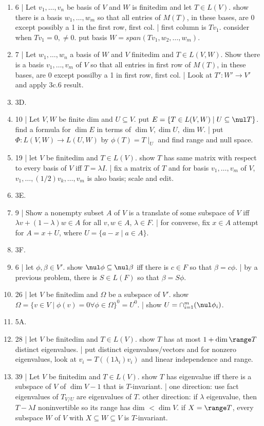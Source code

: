 \begin{enumerate}
	\item 6 | Let $v_1,\dots,v_n$ be basis of $V$ and $W$ is finitedim and let $T \in L(V)$. show there is a basis $w_1,\dots,w_m$ so that all entries of $M(T)$, in these bases, are 0 except possibly a 1 in the first row, first col. | first column is $Tv_1$. consider when $Tv_1 = 0, \neq 0$. put basis $W = span(Tv_1,w_2,\dots,w_m)$. 
	\item 7 | Let $w_1,\dots,w_n$ a basis of $W$ and $V$ finitedim and $T \in L(V,W)$. Show there is a basis $v_1,\dots,v_m$ of $V$ so that all entries in first row of $M(T)$, in these bases, are 0 except possilby a 1 in first row, first col. | Look at $T': W' \to V'$ and apply 3c.6 result. 
	\item 3D. 
	\item 10 | Let $V,W$ be finite dim and $U \subseteq V$. put $E = \{T \in L(V,W) \mid U \subseteq \nul T\}$. find a formula for $\dim E$ in terms of $\dim V, \dim U, \dim W$. | put $\Phi: L(V,W) \to L(U,W)$ by $\phi(T) = T \mid_U$ and find range and null space. 
	\item 19 | let $V$ be finitedim and $T \in L(V)$. show $T$ has same matrix with respect to every basis of $V$ iff $T = \lambda I$. | fix a matrix of $T$ and for basis $v_1,\dots,v_m$ of $V$, $v_1,\dots,(1/2)v_k,\dots,v_m$ is also basis; scale and edit. 
	\item 3E. 
	\item 9 | Show a nonempty subset $A$ of $V$ is a translate of some subspace of $V$ iff $\lambda v + (1-\lambda)w \in A$ for all $v,w \in A$, $\lambda \in F$. | for converse, fix $x \in A$ attempt for $A = x + U$, where $U = \{a-x \mid a \in A\}$. 
	\item 3F. 
	\item 6 | let $\phi,\beta \in V'$. show $\nul\phi \subseteq \nul\beta$ iff there is $c \in F$ so that $\beta = c\phi$. | by a previous problem, there is $S \in L(F)$ so that $\beta = S\phi$. 
	\item 26 | let $V$ be finitedim and $\Omega$ be a subspace of $V'$. show $\Omega = \{v \in V \mid \phi(v)=0 \forall \phi \in \Omega\}^0 = U^0$. | show $U = \cap_{i=1}^{m} (\nul \phi_i)$. 
	\item 5A. 
	\item 28 | let $V$ be finitedim and $T \in L(V)$. show $T$ has at most $1 + \dim\range T$ distinct eigenvalues. | put distinct eigenvalues/vectors and for nonzero eigenvalues, look at $v_i = T((1\lambda_i)v_i)$ and linear independence and range. 
	\item 39 | Let $V$ be finitedim and $T \in L(V)$. show $T$ has eigenvalue iff there is a subspace of $V$ of $\dim V - 1$ that is $T$-invariant. | one direction: use fact eigenvalues of $T_{V/U}$ are eigenvalues of $T$. other direction: if $\lambda$ eigenvalue, then $T-\lambda I$ noninvertible so its range has dim $< \dim V$. if $X = \range T$, every subspace $W$ of $V$ with $X \subseteq W \subseteq V$ is $T$-invariant. 

\end{enumerate}
